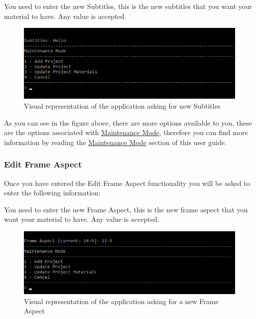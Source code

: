 \documentclass[
  english,
  a4paper,
,tablecaptionabove
]{scrartcl}
\begin{document}
You need to enter the new Subtitles, this is the new subtitles that you
want your material to have. Any value is accepted.

\begin{figure}
\centering
\includegraphics{images/user-guide/maintenance-mode/update-project-material-subtitles.png}
\caption{Visual representation of the application asking for new
Subtitles}
\end{figure}

As you can see in the figure above, there are more options available to
you, these are the options associated with
\protect\hyperlink{using-maintenance-mode}{Maintenance Mode}, therefore
you can find more information by reading the
\protect\hyperlink{using-maintenance-mode}{Maintenance Mode} section of
this user guide.

\newpage

\hypertarget{edit-frame-aspect-1}{%
\subsubsection{Edit Frame Aspect}\label{edit-frame-aspect-1}}

Once you have entered the Edit Frame Aspect functionality you will be
asked to enter the following information:

You need to enter the new Frame Aspect, this is the new frame aspect
that you want your material to have. Any value is accepted.

\begin{figure}
\centering
\includegraphics{images/user-guide/maintenance-mode/update-project-material-frame-aspect.png}
\caption{Visual representation of the application asking for a new Frame
Aspect}
\end{figure}
\end{document}
